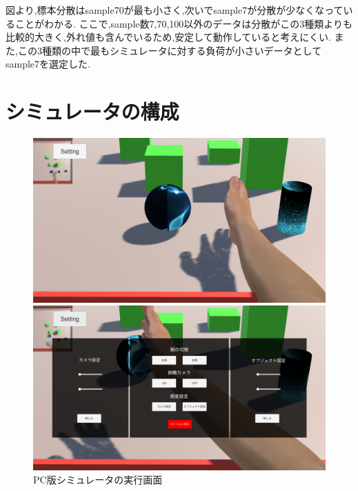 \documentclass{ltjsreport}
\begin{document}
		図より,標本分散はsample70が最も小さく,次いでsample7が分散が少なくなっていることがわかる.
		ここで,sample数7,70,100以外のデータは分散がこの3種類よりも比較的大きく,外れ値も含んでいるため,安定して動作していると考えにくい.
		また,この3種類の中で最もシミュレータに対する負荷が小さいデータとしてsample7を選定した.

	\section{シミュレータの構成}

		\begin{figure}[H]
		\centering
		\begin{minipage}{0.75\columnwidth}
		\centering
		\includegraphics[width = \columnwidth]{../figs/PCnomal.png}
		\end{minipage}
		\hspace{0.04\columnwidth}
		\begin{minipage}{0.75\columnwidth}
		\centering
		\includegraphics[width = \columnwidth]{../figs/PCmenu.png}
		\end{minipage}
		\caption{PC版シミュレータの実行画面}
		\end{figure}
\end{document}

